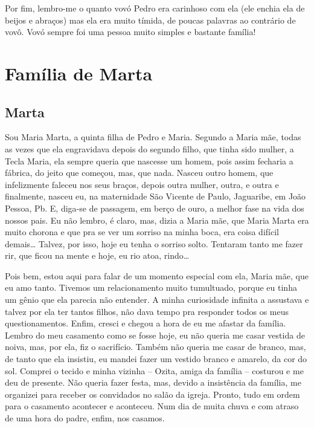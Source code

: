 \documentclass[
  brazil,
  a6paper,
  oneside,
  landscape,
  14pt]{scrbook}
\begin{document}
Por fim, lembro-me o quanto vovó Pedro era carinhoso com ela (ele enchia
ela de beijos e abraços) mas ela era muito tímida, de poucas palavras ao
contrário de vovô. Vovó sempre foi uma pessoa muito simples e bastante
família!

\hypertarget{famuxedlia-de-marta}{%
\chapter{Família de Marta}\label{famuxedlia-de-marta}}

\hypertarget{marta}{%
\section{Marta}\label{marta}}

Sou Maria Marta, a quinta filha de Pedro e Maria. Segundo a Maria mãe,
todas as vezes que ela engravidava depois do segundo filho, que tinha
sido mulher, a Tecla Maria, ela sempre queria que nascesse um homem,
pois assim fecharia a fábrica, do jeito que começou, mas, que nada.
Nasceu outro homem, que infelizmente faleceu nos seus braços, depois
outra mulher, outra, e outra e finalmente, nasceu eu, na maternidade São
Vicente de Paulo, Jaguaribe, em João Pessoa, Pb. E, diga-se de passagem,
em berço de ouro, a melhor fase na vida dos nossos pais. Eu não lembro,
é claro, mas, dizia a Maria mãe, que Maria Marta era muito chorona e que
pra se ver um sorriso na minha boca, era coisa difícil demais\ldots{}
Talvez, por isso, hoje eu tenha o sorriso solto. Tentaram tanto me fazer
rir, que ficou na mente e hoje, eu rio atoa, rindo\ldots{}

Pois bem, estou aqui para falar de um momento especial com ela, Maria
mãe, que eu amo tanto. Tivemos um relacionamento muito tumultuado,
porque eu tinha um gênio que ela parecia não entender. A minha
curiosidade infinita a assustava e talvez por ela ter tantos filhos, não
dava tempo pra responder todos os meus questionamentos. Enfim, cresci e
chegou a hora de eu me afastar da família. Lembro do meu casamento como
se fosse hoje, eu não queria me casar vestida de noiva, mas, por ela,
fiz o sacrifício. Também não queria me casar de branco, mas, de tanto
que ela insistiu, eu mandei fazer um vestido branco e amarelo, da cor do
sol. Comprei o tecido e minha vizinha -- Ozita, amiga da família --
costurou e me deu de presente. Não queria fazer festa, mas, devido a
insistência da família, me organizei para receber os convidados no salão
da igreja. Pronto, tudo em ordem para o casamento acontecer e aconteceu.
Num dia de muita chuva e com atraso de uma hora do padre, enfim, nos
casamos.
\end{document}
